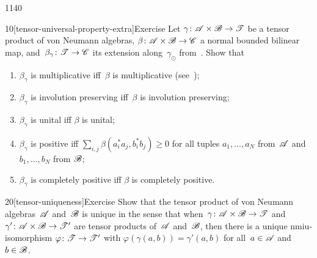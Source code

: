 \begin{parsec}{1140}%
\begin{point}{10}[tensor-universal-property-extra]{Exercise}%
Let $\gamma\colon \mathscr{A}\times \mathscr{B}\to\mathscr{T}$
be a tensor product
of von Neumann algebras,
  $\beta\colon \mathscr{A}\times \mathscr{B}\to\mathscr{C}$
 a normal bounded bilinear map,
 and~$\beta_\gamma\colon \mathscr{T}\to\mathscr{C}$
 its extension along~$\gamma_\odot$
from~.
Show that
\begin{enumerate}
\item
$\beta_\gamma$
is multiplicative iff~$\beta$ is multiplicative
(see~);
\item 
$\beta_\gamma$ 
is involution preserving iff~$\beta$ is involution preserving;
\item
$\beta_\gamma$ is unital
iff $\beta$ is unital;
\item
$\beta_\gamma$ is positive
iff
$\sum_{i,j} \beta(a_i^*a_j,b_i^*b_j) \geq 0$
for all tuples $a_1,\dotsc,a_N$
from~$\mathscr{A}$ and $b_1,\dotsc,b_N$ from $\mathscr{B}$;
\item
$\beta_\gamma$ is completely positive iff
$\beta$ is completely positive.
\end{enumerate}
\spacingfix%
\end{point}%
\begin{point}{20}[tensor-uniqueness]{Exercise}%
Show that the tensor product of von Neumann algebras~$\mathscr{A}$
and~$\mathscr{B}$ is unique in
the sense
that when~$\gamma\colon \mathscr{A}\times \mathscr{B}\to\mathscr{T}$
and~$\gamma'\colon \mathscr{A}\times \mathscr{B}\to\mathscr{T}'$
are tensor products of~$\mathscr{A}$ and~$\mathscr{B}$,
then there is a unique
nmiu-isomorphism $\varphi\colon \mathscr{T}\to\mathscr{T}'$
with $\varphi(\gamma(a,b))=\gamma'(a,b)$
for all~$a\in\mathscr{A}$ and~$b\in\mathscr{B}$.
\end{point}
\end{parsec}
